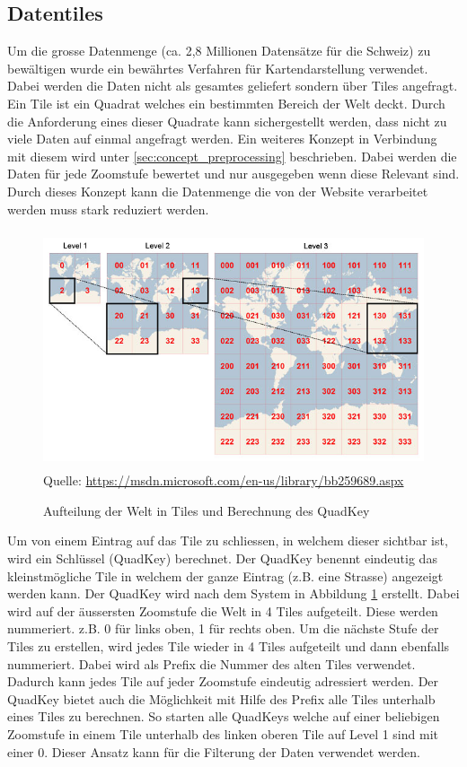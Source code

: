 \subsection{Datentiles}
Um die grosse Datenmenge (ca. 2,8 Millionen Datensätze für die Schweiz) zu bewältigen wurde ein bewährtes Verfahren für Kartendarstellung verwendet. Dabei werden die Daten nicht als gesamtes geliefert sondern über Tiles angefragt. Ein Tile ist ein Quadrat welches ein bestimmten Bereich der Welt deckt. Durch die Anforderung eines dieser Quadrate kann sichergestellt werden, dass nicht zu viele Daten auf einmal angefragt werden. Ein weiteres Konzept in Verbindung mit diesem wird unter \ref{sec:concept_preprocessing}  beschrieben. Dabei werden die Daten für jede Zoomstufe bewertet und nur ausgegeben wenn diese Relevant sind. Durch dieses Konzept kann die Datenmenge die von der Website verarbeitet werden muss stark reduziert werden.
\begin{figure}[H]
\centering
\includegraphics[height=7cm]{images/BingMapsTileSystem.jpg}
\\Quelle: \href{https://msdn.microsoft.com/en-us/library/bb259689.aspx}{https://msdn.microsoft.com/en-us/library/bb259689.aspx}
\caption{Aufteilung der Welt in Tiles und Berechnung des QuadKey}
\label{fig:tilesystem}
\end{figure}
\noindent
Um von einem Eintrag auf das Tile zu schliessen, in welchem dieser sichtbar ist, wird ein Schlüssel (QuadKey) berechnet. Der QuadKey benennt eindeutig das kleinstmögliche Tile in welchem der ganze Eintrag (z.B. eine Strasse) angezeigt werden kann. Der QuadKey wird nach dem System in Abbildung \ref{fig:tilesystem} erstellt. Dabei wird auf der äussersten Zoomstufe die Welt in 4 Tiles aufgeteilt. Diese werden nummeriert. z.B. 0 für links oben, 1 für rechts oben. Um die nächste Stufe der Tiles zu erstellen, wird jedes Tile wieder in 4 Tiles aufgeteilt und dann ebenfalls nummeriert. Dabei wird als Prefix die Nummer des alten Tiles verwendet. Dadurch kann jedes Tile auf jeder Zoomstufe eindeutig adressiert werden. Der QuadKey bietet auch die Möglichkeit mit Hilfe des Prefix alle Tiles unterhalb eines Tiles zu berechnen. So starten alle QuadKeys welche auf einer beliebigen Zoomstufe in einem Tile unterhalb des linken oberen Tile auf Level 1 sind mit einer 0. Dieser Ansatz kann für die Filterung der Daten verwendet werden.
